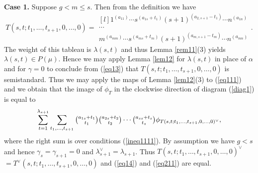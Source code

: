 \documentclass[ALCO,Unicode]{cedram}
\newcommand{\al}{\alpha}
\newcommand{\la}{\lambda}
\numberwithin{equation}{section}
\begin{document}
\textbf{Case 1.} Suppose $g<m \le s$. Then from the definition we have \begin{equation}\label{eq13}T(s,t;t_1,\dots,t_{s+1},0,\dots,0)=\begin{matrix*}[l]
		1^{(a_{11})} \cdots s^{(a_{1s}+t_1)}(s+1)^{(a_{2,s+1}-t_1)} \cdots n^{(a_{1n})} \\
		\cdots \\ 
		m^{(a_{mm})}\cdots s^{(a_{ms}+t_m)}(s+1)^{(a_{m,s+1}-t_m)} \cdots n^{(a_{mn})}   \end{matrix*}.\end{equation}
The weight of this tableau is $\la(s,t)$ and thus Lemma \ref{rem11}(3) yields $\la(s,t) \in P(\mu)$. Hence we may apply Lemma \ref{lem12} for $\la(s,t)$ in place of $\al$ and for $\gamma=0$ to conclude from (\ref{eq13}) that $T(s,t;t_1,\dots,t_{s+1},0,\dots,0)$ is semistandard. Thus we may apply the maps of Lemma \ref{lem12}(3) to  (\ref{eq111}) and we obtain that the image of $\phi_T$  in the clockwise direction of diagram (\ref{diag1}) is equal to 
\begin{equation}\label{eq14}
	\sum_{t=1}^{\lambda_{s+1}}\sum_{t_1,\dots,t_{s+1}}\tbinom{a_{1s}+t_1}{t_1}\tbinom{a_{2s}+t_2}{t_2} \cdots \tbinom{a_{ss}+t_s}{t_s}\phi_{T(s,t;t_1,\dots,t_{s+1},0,\dots,0)^{\vee}},\end{equation}
where the right sum is over conditions (\ref{ineq1111}).
By assumption we have $g < s$ and hence $\gamma_s=\gamma_{s+1}=0 $ and $\la^{\vee}_{s+1}=\la_{s+1}$. Thus $T(s,t;t_1,\dots,t_{s+1},0,\dots,0)^{\vee}$ $=T^{\vee}(s,t;t_1,\dots,t_{s+1},0,\dots,0)$ and (\ref{eq14}) and (\ref{eq211}) are equal.
\end{document}
